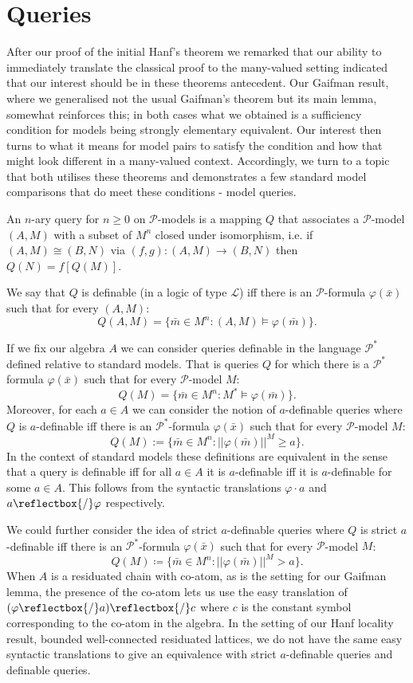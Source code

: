 \documentclass{lmcs} %
\newcommand{\?}{\ensuremath{\mkern0.4\thinmuskip}}
\let\isom=\cong%
\newcommand{\und}{\mathord{\reflectbox{/}}}%
\let\phi=\varphi
\newcommand{\CL}{\mathcal{L}}
\newcommand{\CP}{\mathcal{P}}
\begin{document}
\section{Queries}\label{sec:queries}
After our proof of the initial Hanf's theorem we remarked that our ability to immediately translate the classical proof to the many-valued setting indicated that our interest should be in these theorems antecedent. Our Gaifman result, where we generalised not the usual Gaifman's theorem but its main lemma, somewhat reinforces this; in both cases what we obtained is a sufficiency condition for models being strongly elementary equivalent. Our interest then turns to what it means for model pairs to satisfy the condition and how that might look different in a many-valued context. Accordingly, we turn to a topic that both utilises these theorems and demonstrates a few standard model comparisons that do meet these conditions - model queries. 

\begin{defi}
    An $n$-ary query for $n\geq 0$ on $\CP$-models is a mapping $Q$ that associates a $\CP$-model $(A,M)$ with a subset of $M^n$ closed under isomorphism, i.e. if $(A,M)\isom (B,N)$ via $(f,g)\colon (A,M)\rightarrow (B,N)$ then $Q(N)=f[Q(M)]$.

    We say that $Q$ is definable (in a logic of type $\CL$) iff there is an $\CP$-formula $\phi(\bar{x})$ such that for every $(A,M)$: 
    \[Q(A,M)=\{\bar{m}\in M^n:(A,M)\models\phi(\bar{m})\}.\]
\end{defi}

\begin{rem}
    If we fix our algebra $A$ we can consider queries definable in the language $\CP^\ast$ defined relative to standard models. That is queries $Q$ for which there is a $\CP^\ast$ formula $\phi(\bar{x})$ such that for every $\CP$-model $M$: \[Q(M)=\{\bar{m}\in M^n:M^\ast\models\phi(\bar{m})\}.\]
    Moreover, for each $a\in A$ we can consider the notion of $a$-definable queries where $Q$ is $a$-definable iff there is an $\CP^\ast$-formula $\phi(\bar{x})$ such that for every $\CP$-model $M$: \[Q(M):=\{\bar{m}\in M^n:||\phi(\bar{m})||^{M}\geq a\}.\]
    In the context of standard models these definitions are equivalent in the sense that a query is definable iff for all $a\in A$ it is $a$-definable iff it is $a$-definable for some $a\in A$. This follows from the syntactic translations $\phi\cdot a$ and $a\und \phi$ respectively.

    We could further consider the idea of strict $a$-definable queries where $Q$ is  strict $a$-definable iff there is an $\CP^\ast$-formula $\phi(\bar{x})$ such that for every $\CP$-model $M$:\[Q(M)\coloneqq \{\bar{m}\in M^n:||\phi(\bar{m})||^M> a\}.\]
    When $A$ is a residuated chain with co-atom, as is the setting for our Gaifman lemma, the presence of the co-atom lets us use the easy translation of $(\phi\und a)\und c$ where $c$ is the constant symbol corresponding to the co-atom in the algebra. In the setting of our Hanf locality result, bounded well-connected residuated lattices, we do not have the same easy syntactic translations to give an equivalence with strict $a$-definable queries and definable queries.
\end{rem}
\end{document}
